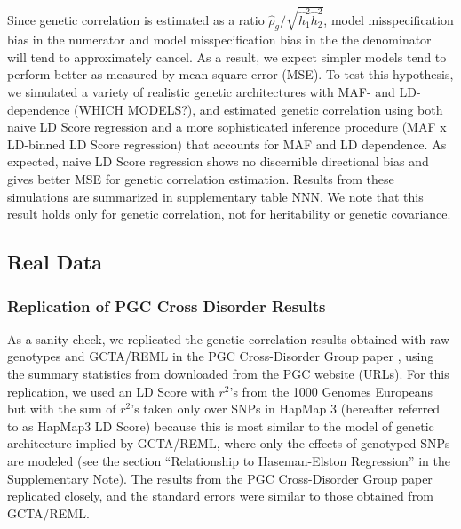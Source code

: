 \documentclass[11pt]{article}
\begin{document}
Since genetic correlation is estimated as a ratio $\hat{\rho}_g / \sqrt{\hat{h}^2_1\hat{h}^2_2}$, model misspecification bias in the numerator and model misspecification bias in the the denominator will tend to approximately cancel. As a result, we expect simpler models tend to perform better as measured by mean square error (MSE).
To test this hypothesis, we simulated a variety of realistic genetic architectures with MAF- and LD-dependence (WHICH MODELS?), and estimated genetic correlation using both naive LD Score regression and a more sophisticated inference procedure (MAF x LD-binned LD Score regression) that accounts for MAF and LD dependence. 
As expected, naive LD Score regression shows no discernible directional bias and gives better MSE for genetic correlation estimation.
Results from these simulations are summarized in supplementary table NNN.
We note that this result holds only for genetic correlation, not for heritability or genetic covariance.


\subsection{Real Data}\label{Real Data}

\subsubsection{Replication of PGC Cross Disorder Results}

As a sanity check, we replicated the genetic correlation results obtained with
raw genotypes and GCTA/REML in
the PGC Cross-Disorder Group paper \cite{pgccdg2013}, 
using the summary statistics from \cite{cross2013identification} downloaded from the PGC website (URLs).
For this replication, we used an LD Score with $r^2$'s from the 1000 Genomes Europeans
but with the sum of $r^2$'s taken only over SNPs in HapMap 3 
(hereafter referred to as HapMap3 LD Score)
because this is most similar to the model of genetic architecture implied by GCTA/REML,
where only the effects of genotyped SNPs are modeled
(see the section ``Relationship to Haseman-Elston Regression'' in the Supplementary Note). 
The results from the PGC Cross-Disorder Group paper replicated closely, 
and the standard errors were similar to those obtained from GCTA/REML.
\end{document}
